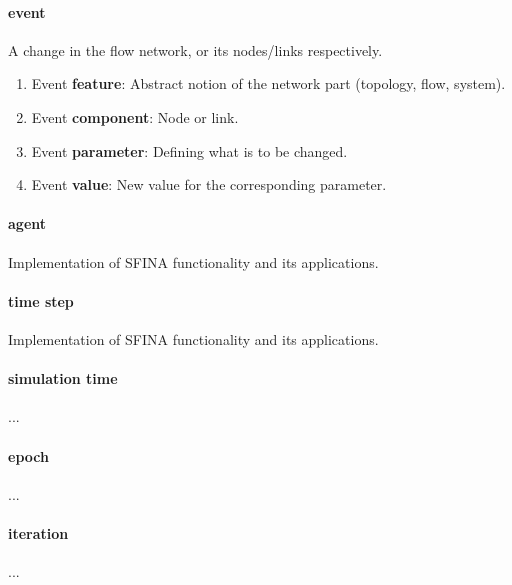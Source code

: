 \documentclass[11pt,fleqn]{book} %
\begin{document}
\paragraph{event}
A change in the flow network, or its nodes/links respectively.
\begin{enumerate}
	\item Event \textbf{feature}: Abstract notion of the network part (topology, flow, system).
	\item Event \textbf{component}: Node or link.
	\item Event \textbf{parameter}: Defining what is to be changed.
	\item Event \textbf{value}: New value for the corresponding parameter.
\end{enumerate}

\paragraph{agent}
Implementation of SFINA functionality and its applications.

\paragraph{time step}
Implementation of SFINA functionality and its applications.

\paragraph{simulation time}
...

\paragraph{epoch}
...

\paragraph{iteration}
...
\end{document}
